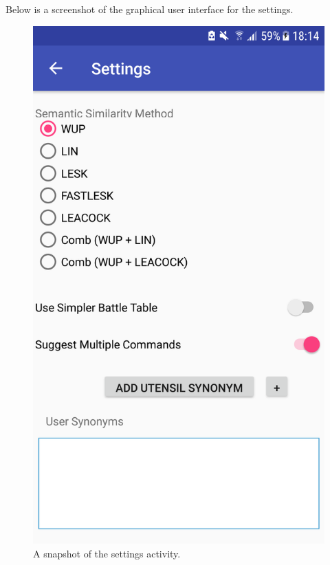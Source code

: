 \documentclass[11pt]{article}
\begin{document}
\begin{appendices}
\newpage
Below is a screenshot of the graphical user interface for the settings.

\begin{figure}[H]
\begin{center}
  \includegraphics[scale=0.25]{settings.png}
  \caption{A snapshot of the settings activity.}
  \label{fig:snapshot-settings}
  \end{center}
\end{figure}


\end{appendices}
\end{document}
